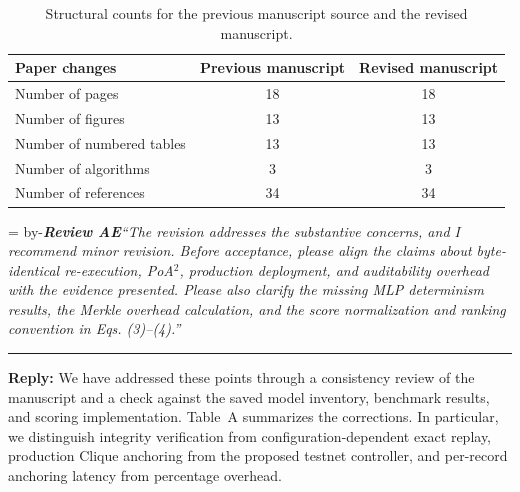 \documentclass[11pt]{article}
\newcommand{\roomfor}[1]{\par\begingroup\dimen0=\pagegoal\advance\dimen0 by-\pagetotal\ifdim\dimen0<#1\baselineskip\newpage\fi\endgroup}
\newcommand{\review}[2]{\roomfor{10}\bigskip\noindent\textbf{\textit{Review #1}}\quad\textit{``#2''}\par\smallskip\hrule\medskip}
\newcommand{\reply}{\noindent\textbf{Reply:} }
\begin{document}
\begin{table}[!htbp]
\centering
\caption{Structural counts for the previous manuscript source and the revised manuscript.}
\begin{tabular}{lcc}
\toprule
Paper changes & Previous manuscript & Revised manuscript \\
\midrule
Number of pages & 18 & 18 \\
Number of figures & 13 & 13 \\
Number of numbered tables & 13 & 13 \\
Number of algorithms & 3 & 3 \\
Number of references & 34 & 34 \\
\bottomrule
\end{tabular}
\end{table}

\newpage

\review{AE}{The revision addresses the substantive concerns, and I recommend minor revision. Before acceptance, please align the claims about byte-identical re-execution, PoA$^2$, production deployment, and auditability overhead with the evidence presented. Please also clarify the missing MLP determinism results, the Merkle overhead calculation, and the score normalization and ranking convention in Eqs. (3)--(4).}


\reply We have addressed these points through a consistency review of the
manuscript and a check against the saved model inventory, benchmark results,
and scoring implementation. Table~A summarizes the corrections. In
particular, we distinguish integrity verification from configuration-dependent
exact replay, production Clique anchoring from the proposed testnet controller,
and per-record anchoring latency from percentage overhead.
\end{document}
